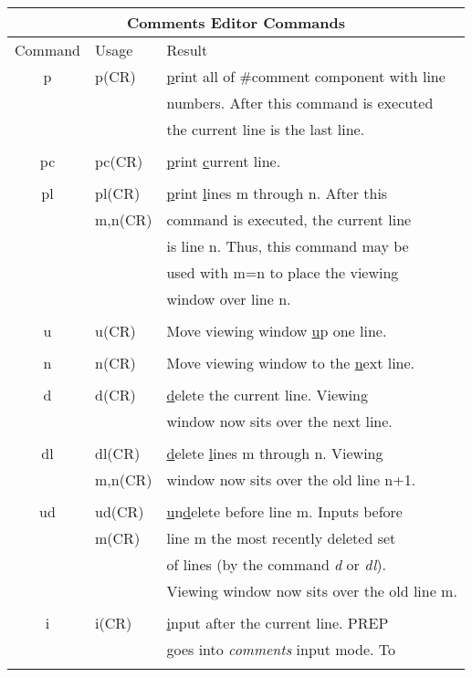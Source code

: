 \begin{table}
\begin{center}
\begin{tabular}{|c|l|l|} \hline
\multicolumn{3}{|c|}{Comments Editor Commands} \\ \hline Command & Usage &
Result \\ \hline p & p(CR) & {\underline p}rint all of \#comment component
with line \\ & & numbers. After this command is executed \\ & & the current
line is the last line. \\ & & \\ pc & pc(CR) & {\underline p}rint
{\underline c}urrent line. \\ & & \\ pl & pl(CR) & {\underline p}rint
{\underline l}ines m through n. After this \\ & m,n(CR) & command is
executed, the current line \\ & & is line n. Thus, this command may be \\ &
& used with m=n to place the viewing \\ & & window over line n. \\ & & \\ u
& u(CR) & Move viewing window {\underline u}p one line. \\ & & \\ n & n(CR)
& Move viewing window to the {\underline n}ext line. \\ & & \\ d & d(CR) &
{\underline d}elete the current line. Viewing \\ & & window now sits over
the next line. \\ & & \\ dl & dl(CR) & {\underline d}elete {\underline
l}ines m through n. Viewing \\ & m,n(CR) & window now sits over the old
line n+1. \\ & & \\ ud & ud(CR) & {\underline u}n{\underline d}elete before
line m. Inputs before\\ & m(CR) & line m the most recently deleted set \\ &
& of lines (by the command {\em d} or {\em dl}).\\ & & Viewing window now
sits over the old line m. \\ & & \\ i & i(CR) & {\underline i}nput after
the current line. PREP \\ & & goes into {\em comments} input mode. To \\ &

\end{tabular}
\end{center}
\end{table}
